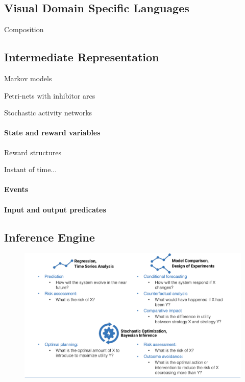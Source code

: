 \documentclass[11pt]{article}
\begin{document}
\subsection{Visual Domain Specific Languages}

Composition \cite{sanders1992dependability,sanders1988construction}

\subsection{Intermediate Representation}

Markov models \cite{howard2012dynamic}

Petri-nets with inhibitor arcs \cite{chiola1993generalized}

Stochastic activity networks \cite{movaghar1985performability,sanders2000stochastic}

\paragraph{State and reward variables}

Reward structures \cite{qureshi1996algorithms,deavours1999efficient,ciardo1996well,sanders1991reduced}

Instant of time... \cite{freire1990technique}

\paragraph{Events}

\paragraph{Input and output predicates}

\subsection{Inference Engine}

\begin{figure}
  \includegraphics[width=\textwidth]{figs/table.pdf}
  \caption{}
  \label{Fig:InferenceClasses}
\end{figure}
\end{document}
